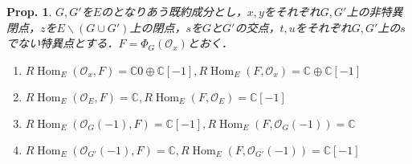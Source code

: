 \documentclass[uplatex,a4paper,11pt,dvipdfmx]{jsarticle}
\theoremstyle{mystyle} %
\newtheorem{proposition}{Prop.}[section]
\DeclareMathOperator{\Hom}{Hom}
\begin{document}
\begin{proposition}
	$G, G'$を$E$のとなりあう既約成分とし，$x,y$をそれぞれ$G, G'$上の非特異閉点，$z$を$E \backslash (G \cup G')$上の閉点，$s$を$G$と$G'$の交点，$t, u$をそれぞれ$G, G'$上の$s$でない特異点とする．$F = \Phi_G(\mathcal{O}_x)$とおく．
	\begin{enumerate}
		\item $R\Hom_E(\mathcal{O}_x, F) = \mathbb{C}0 \oplus \mathbb{C}[-1],R\Hom_E(F, \mathcal{O}_x) = \mathbb{C} \oplus \mathbb{C}[-1]$
		\item $R\Hom_E(\mathcal{O}_E, F) = \mathbb{C} ,R\Hom_E(F, \mathcal{O}_E) = \mathbb{C}[-1]$
		\item $R\Hom_E(\mathcal{O}_G(-1), F) = \mathbb{C}[-1] ,R\Hom_E(F, \mathcal{O}_G(-1)) = \mathbb{C}$
		\item $R\Hom_E(\mathcal{O}_{G'}(-1), F) = \mathbb{C} ,R\Hom_E(F, \mathcal{O}_{G'}(-1)) = \mathbb{C}[-1]$
	\end{enumerate}
\end{proposition}
\end{document}
